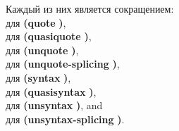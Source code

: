 {%
\renewcommand{\baselinestretch}{1.05}
\selectfont
\begin{entry}{%
}\vspace{-1mm}

Каждый из них является сокращением:
\\\quad{}
для {\cf \textbf{(quote} \textbf{)}},
\\\quad{}
для {\cf \textbf{(quasiquote} \textbf{)}},
\\\quad\schindex{\bfseries ,}{\cf\bfseries ,}
для {\cf \textbf{(unquote} \textbf{)}},
\\\quad{}
для {\cf \textbf{(unquote-splicing} \textbf{)}},
\\\quad{}
для {\cf \textbf{(syntax} \textbf{)}},
\\\quad{}
для {\cf \textbf{(quasisyntax} \textbf{)}},
\\\quad\sharpindex{,}{\bfseries\cf\#,}
для {\cf \textbf{(unsyntax} \textbf{)}}, and
\\\quad{}
для {\cf \textbf{(unsyntax-splicing} \textbf{)}}.
\end{entry}\vspace{-1mm}

}

